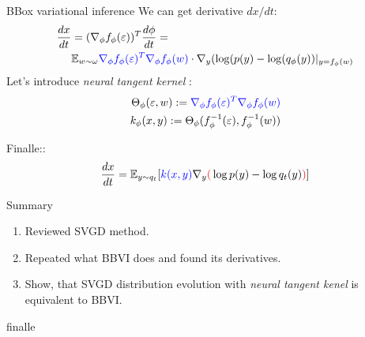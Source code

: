 \documentclass{beamer}
\begin{document}
\begin{frame}{BBox variational inference}
    We can get derivative $dx/dt$:
    \begin{align}
        \frac{dx}{dt}& =(\nabla_\phi f_\phi(\varepsilon))^T \frac{d\phi}{dt}=\\
        &\mathbb{E}_{w \sim \omega} {\color{blue} \nabla_\phi f_\phi(\varepsilon)^T \nabla_\phi f_\phi(w)}\cdot \nabla_y (\log(p(y) - \log(q_\phi(y))|_{y = f_\phi(w)} 
    \end{align}
    Let's introduce \textit{neural tangent kernel} \cite{jacot2018neural}:
    \begin{align}
        \Theta_\phi(\varepsilon, w) := {\color{blue} \nabla_\phi f_\phi(\varepsilon)^T \nabla_\phi f_\phi(w)} \\
        k_\phi(x, y) := \Theta_\phi(f_\phi^{-1}(\varepsilon), f_\phi^{-1}(w))
    \end{align}

Finalle::
    $$
        \frac{dx}{dt} = \mathbb{E}_{y \sim q_t} [{\color{blue} k(x, y)} \nabla_y {\color{red}(} \log p(y) - \log q_t(y) {\color{red})}]
    $$
    
\end{frame}

\begin{frame}{Summary}
\begin{enumerate}
    \item Reviewed SVGD method.
    \item Repeated what BBVI does and found its derivatives.
    \item Show, that SVGD distribution evolution with \textit{neural tangent kenel} is equivalent to BBVI.
\end{enumerate}    
\end{frame}
\begin{frame}{finalle}
    \printbibliography
\end{frame}
\end{document}
